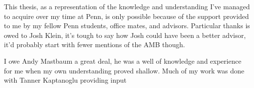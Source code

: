 
\begin{acknowledgements}
  This thesis, as a representation of the knowledge and understanding I've managed to acquire
 over my time at Penn, is only possible because of the support provided
  to me by my fellow Penn students, office mates, and advisors.
  Particular thanks is owed to Josh Klein, it's tough to say how
  Josh could have been a better advisor, it'd probably start with fewer
  mentions of the AMB though.

  I owe Andy Mastbaum a great deal, he was a well of knowledge and experience for me
  when my own understanding proved shallow.
  Much of my work was done with Tanner Kaptanoglu providing input


\end{acknowledgements}



